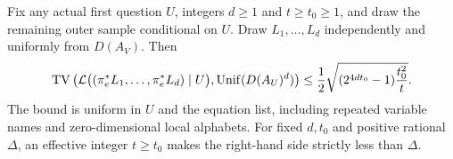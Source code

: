 \begin{lemma}\label{lem:smoothness}
Fix any actual first question $U$, integers $d\ge1$ and $t\ge t_0\ge1$,
and draw the remaining outer sample conditional on $U$. Draw
$L_1,\ldots,L_d$ independently and uniformly from $D(A_V)$. Then
\begin{equation}\label{eq:smoothness-bound}
 \operatorname{TV}\left(\mathcal L\bigl((\pi_e^*L_1,\ldots,\pi_e^*L_d)\mid U\bigr),
                 \operatorname{Unif}(D(A_U)^d)\right)
 \le\frac12\sqrt{(2^{4dt_0}-1)\frac{t_0^2}{t}}.
\end{equation}
The bound is uniform in $U$ and the equation list, including repeated
variable names and zero-dimensional local alphabets. For fixed $d,t_0$
and positive rational $\Delta$, an effective integer $t\ge t_0$ makes
the right-hand side strictly less than $\Delta$.
\end{lemma}
